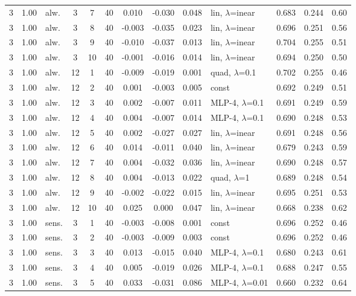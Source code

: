 \documentclass[10pt]{article}
\begin{document}
\begin{scriptsize}
\begin{longtable}{cclcc c ccc l ccc}
3 & 1.00 & alw. & 3 & 7 & 40 & 0.010 & -0.030 & 0.048 & lin, $\lambda$=inear & 0.683 & 0.244 & 0.60 \\
3 & 1.00 & alw. & 3 & 8 & 40 & -0.003 & -0.035 & 0.023 & lin, $\lambda$=inear & 0.696 & 0.251 & 0.56 \\
3 & 1.00 & alw. & 3 & 9 & 40 & -0.010 & -0.037 & 0.013 & lin, $\lambda$=inear & 0.704 & 0.255 & 0.51 \\
3 & 1.00 & alw. & 3 & 10 & 40 & -0.001 & -0.016 & 0.014 & lin, $\lambda$=inear & 0.694 & 0.250 & 0.50 \\
3 & 1.00 & alw. & 12 & 1 & 40 & -0.009 & -0.019 & 0.001 & quad, $\lambda$=0.1 & 0.702 & 0.255 & 0.46 \\
3 & 1.00 & alw. & 12 & 2 & 40 & 0.001 & -0.003 & 0.005 & const & 0.692 & 0.249 & 0.51 \\
3 & 1.00 & alw. & 12 & 3 & 40 & 0.002 & -0.007 & 0.011 & MLP-4, $\lambda$=0.1 & 0.691 & 0.249 & 0.59 \\
3 & 1.00 & alw. & 12 & 4 & 40 & 0.004 & -0.007 & 0.014 & MLP-4, $\lambda$=0.1 & 0.690 & 0.248 & 0.53 \\
3 & 1.00 & alw. & 12 & 5 & 40 & 0.002 & -0.027 & 0.027 & lin, $\lambda$=inear & 0.691 & 0.248 & 0.56 \\
3 & 1.00 & alw. & 12 & 6 & 40 & 0.014 & -0.011 & 0.040 & lin, $\lambda$=inear & 0.679 & 0.243 & 0.59 \\
3 & 1.00 & alw. & 12 & 7 & 40 & 0.004 & -0.032 & 0.036 & lin, $\lambda$=inear & 0.690 & 0.248 & 0.57 \\
3 & 1.00 & alw. & 12 & 8 & 40 & 0.004 & -0.013 & 0.022 & quad, $\lambda$=1 & 0.689 & 0.248 & 0.54 \\
3 & 1.00 & alw. & 12 & 9 & 40 & -0.002 & -0.022 & 0.015 & lin, $\lambda$=inear & 0.695 & 0.251 & 0.53 \\
3 & 1.00 & alw. & 12 & 10 & 40 & 0.025 & 0.000 & 0.047 & lin, $\lambda$=inear & 0.668 & 0.238 & 0.62 \\
3 & 1.00 & sens. & 3 & 1 & 40 & -0.003 & -0.008 & 0.001 & const & 0.696 & 0.252 & 0.46 \\
3 & 1.00 & sens. & 3 & 2 & 40 & -0.003 & -0.009 & 0.003 & const & 0.696 & 0.252 & 0.46 \\
3 & 1.00 & sens. & 3 & 3 & 40 & 0.013 & -0.015 & 0.040 & MLP-4, $\lambda$=0.1 & 0.680 & 0.243 & 0.61 \\
3 & 1.00 & sens. & 3 & 4 & 40 & 0.005 & -0.019 & 0.026 & MLP-4, $\lambda$=0.1 & 0.688 & 0.247 & 0.55 \\
3 & 1.00 & sens. & 3 & 5 & 40 & 0.033 & -0.031 & 0.086 & MLP-4, $\lambda$=0.01 & 0.660 & 0.232 & 0.64 \\

\end{longtable}
\end{scriptsize}
\end{document}
